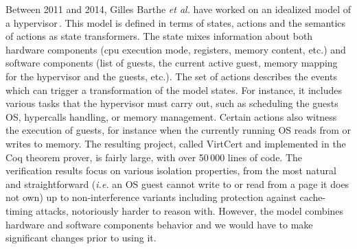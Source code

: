 Between 2011 and 2014, Gilles Barthe \emph{et al.} have worked on an idealized
model of a
hypervisor\,\cite{barthe2011virtcert1,barthe2012virtcert2,barthe2014virtcert3}.
%
This model is defined in terms of states, actions and the semantics of actions
as state trans\-formers.
%
The state mixes information about both hardware components (\ac{cpu} execution
mode, registers, memory content, etc.) and software components (list of guests,
the current active guest, memory mapping for the hypervisor and the guests,
etc.).
%
The set of actions describes the events which can trigger a transformation of
the model states.
%
For instance, it includes various tasks that the hypervisor must carry out, such
as scheduling the guests OS, hypercalls handling, or memory management.
%
Certain actions also witness the execution of guests, for instance when the
currently running OS reads from or writes to memory.
%
The resulting project, called VirtCert and implemented in the Coq theorem
prover, is fairly large, with over 50\,000 lines of code.
%
The verification results focus on various isolation properties, from the most
natural and straightforward (\emph{i.e.} an OS guest cannot write to or read
from a page it does not own) up to non-interference variants including
protection against cache-timing attacks, notoriously harder to reason with.
%
However, the model combines hardware and software components behavior and we
would have to make significant changes prior to using it.

%


